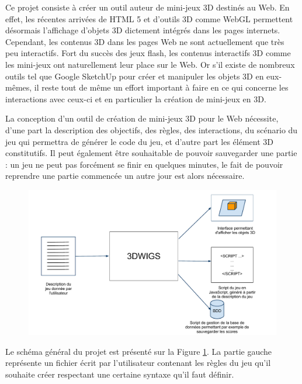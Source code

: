 Ce projet consiste à créer un outil auteur de mini-jeux 3D destinés au Web.
En effet, les récentes arrivées de HTML 5 et d'outils 3D comme WebGL permettent désormais l'affichage d'objets 3D dictement
intégrés dans les pages internets.
Cependant, les contenus 3D dans les pages Web ne sont actuellement que très peu interactifs.
Fort du succès des jeux flash, les contenus interactifs 3D comme les mini-jeux ont naturellement leur place sur le Web.
Or s'il existe de nombreux outils tel que Google SketchUp pour créer et manipuler les objets 3D en eux-mêmes,
il reste tout de même un effort important à faire en ce qui concerne les interactions avec ceux-ci et en particulier la création de mini-jeux en 3D.

\vspace{0.5cm}

La conception d'un outil de création de mini-jeux 3D pour le Web nécessite, d'une part la description des objectifs, des règles, des interactions, 
du scénario du jeu qui permettra de générer le code du jeu, et d'autre part les élément 3D constitutifs.
Il peut également être souhaitable de pouvoir sauvegarder une partie :
un jeu ne peut pas forcément se finir en quelques minutes, le fait de pouvoir reprendre une partie commencée un autre jour est alors nécessaire.

\begin{figure}[h]
 \includegraphics[width=\linewidth]{img/schema_general}
 \label{fig:schemaprojet}
\end{figure}

Le schéma général du projet est présenté sur la Figure \ref{fig:schemaprojet}.
La partie gauche représente un fichier écrit par l'utilisateur contenant les règles du jeu qu'il souhaite créer respectant
une certaine syntaxe qu'il faut définir.

